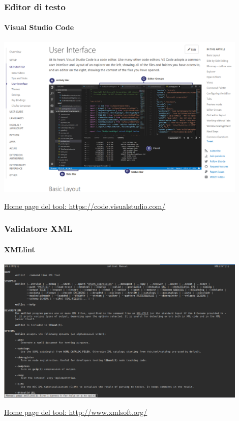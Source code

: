 \begin{frame}
	\frametitle{Editor di testo}
	\framesubtitle{Visual Studio Code}
	\addtocounter{nframe}{1}

	\begin{center}
		\includegraphics[width=0.9\textwidth]{imgs/VisualCode.png}
	\end{center}

	\href{https://code.visualstudio.com/}{Home page del tool: \url{https://code.visualstudio.com/}}

\end{frame}


\begin{frame}
	\frametitle{Validatore XML}
	\framesubtitle{XMLlint}
	\addtocounter{nframe}{1}

	\begin{center}
		\includegraphics[width=0.9\textwidth]{imgs/XMLLINT.png}
	\end{center}

	\href{http://www.xmlsoft.org/}{Home page del tool: \url{http://www.xmlsoft.org/}}


\end{frame}

